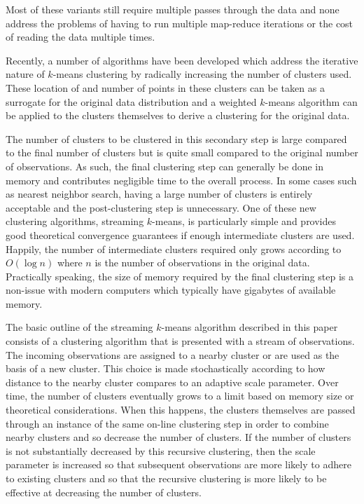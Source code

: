 \documentclass[11pt]{amsart}
\begin{document}
Most of these variants still require multiple passes through the data and none address the problems of having to run multiple map-reduce iterations or the cost of reading the data multiple times.

Recently, a number of algorithms have been developed which address the iterative nature of $k$-means clustering by radically increasing the number of clusters used.  These location of and number of points in these clusters can be taken as a surrogate for the original data distribution and a weighted $k$-means algorithm can be applied to the clusters themselves to derive a clustering for the original data.  

The number of clusters to be clustered in this secondary step is large compared to the final number of clusters but is quite small compared to the original number of observations.  As such, the final clustering step can generally be done in memory and contributes negligible time to the overall process.  In some cases such as nearest neighbor search, having a large number of clusters is entirely acceptable and the post-clustering step is unnecessary.  One of these new clustering algorithms, streaming $k$-means\cite{DBLP:conf/nips/ShindlerWM11}, is particularly simple and provides good theoretical convergence guarantees if enough intermediate clusters are used.  Happily, the number of intermediate clusters required only grows according to $O(\log n)$ where $n$ is the number of observations in the original data.  Practically speaking, the size of memory required by the final clustering step is a non-issue with modern computers which typically have gigabytes of available memory.

The basic outline of the streaming $k$-means algorithm described in this paper consists of a clustering algorithm that is presented with a stream of observations.  The incoming observations are assigned to a nearby cluster or are used as the basis of a new cluster.  This choice is made stochastically according to how distance to the nearby cluster compares to an adaptive scale parameter.  Over time, the number of clusters eventually grows to a limit based on memory size or theoretical considerations.  When this happens, the clusters themselves are passed through an instance of the same on-line clustering step in order to combine nearby clusters and so decrease the number of clusters.  If the number of clusters is not substantially decreased by this recursive clustering, then the scale parameter is increased so that subsequent observations are more likely to adhere to existing clusters and so that the recursive clustering is more likely to be effective at decreasing the number of clusters.
\end{document}
